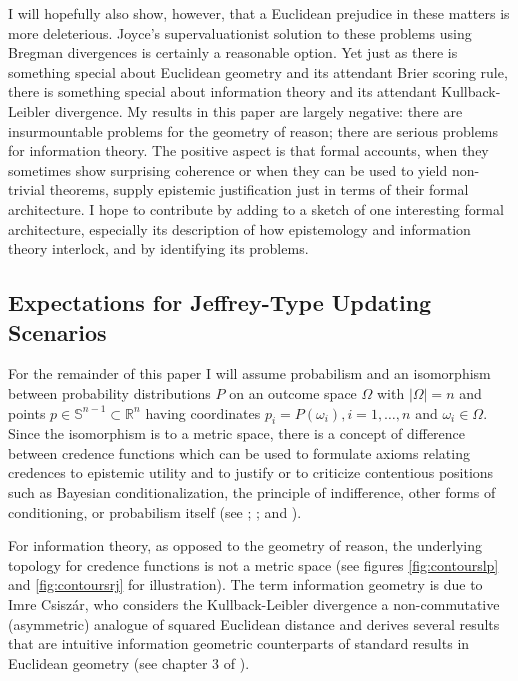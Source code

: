 \documentclass[12pt]{article}
\begin{document}
I will hopefully also show, however, that a Euclidean prejudice in
these matters is more deleterious. Joyce's supervaluationist solution
to these problems using Bregman divergences is certainly a reasonable
option. Yet just as there is something special about Euclidean
geometry and its attendant Brier scoring rule, there is something
special about information theory and its attendant Kullback-Leibler
divergence. My results in this paper are largely negative: there are
insurmountable problems for the geometry of reason; there are serious
problems for information theory. The positive aspect is that formal
accounts, when they sometimes show surprising coherence or when they
can be used to yield non-trivial theorems, supply epistemic
justification just in terms of their formal architecture. I hope to
contribute by adding to a sketch of one interesting formal
architecture, especially its description of how epistemology and
information theory interlock, and by identifying its problems.

\subsection{Expectations for Jeffrey-Type Updating Scenarios}
\label{subsec:vidiedoo}

For the remainder of this paper I will assume probabilism and an
isomorphism between probability distributions $P$ on an outcome space
$\Omega$ with $|\Omega|=n$ and points
$p\in\mathbb{S}^{n-1}\subset\mathbb{R}^{n}$ having coordinates
$p_{i}=P(\omega_{i}),i=1,\ldots,n$ and $\omega_{i}\in{}\Omega$. Since
the isomorphism is to a metric space, there is a concept of difference
between credence functions which can be used to formulate axioms
relating credences to epistemic utility and to justify or to criticize
contentious positions such as Bayesian conditionalization, the
principle of indifference, other forms of conditioning, or probabilism
itself (see ; ;
and ).

For information theory, as opposed to the geometry of reason, the
underlying topology for credence functions is not a metric space (see
figures \ref{fig:contourslp} and \ref{fig:contoursrj} for
illustration). The term information geometry is due to Imre
Csisz{\'a}r, who considers the Kullback-Leibler divergence a
non-commutative (asymmetric) analogue of squared Euclidean distance
and derives several results that are intuitive information geometric
counterparts of standard results in Euclidean geometry (see chapter 3
of ).
\end{document}
